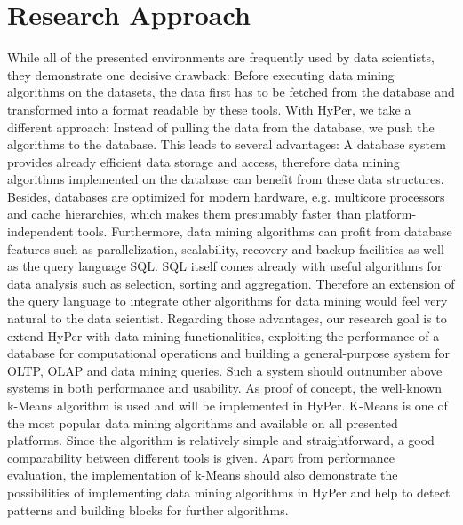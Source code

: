 \chapter{Research Approach}\label{chapter:research}

While all of the presented environments are frequently used by data scientists, they demonstrate one decisive drawback: Before executing data mining algorithms on the datasets, the data first has to be fetched from the database and transformed into a format readable by these tools. With HyPer, we take a different approach: Instead of pulling the data from the database, we push the algorithms to the database. This leads to several advantages: A database system provides already efficient data storage and access, therefore data mining algorithms implemented on the database can benefit from these data structures. Besides, databases are optimized for modern hardware, e.g. multicore processors and cache hierarchies, which makes them presumably faster than platform-independent tools. Furthermore, data mining algorithms can profit from database features such as parallelization, scalability, recovery and backup facilities as well as the query language SQL. SQL itself comes already with useful algorithms for data analysis such as selection, sorting and aggregation. Therefore an extension of the query language to integrate other algorithms for data mining would feel very natural to the data scientist. 
Regarding those advantages, our research goal is to extend HyPer with data mining functionalities, exploiting the performance of a database for computational operations and building a general-purpose system for OLTP, OLAP and data mining queries. Such a system should outnumber above systems in both performance and usability.
As proof of concept, the well-known k-Means algorithm is used and will be implemented in HyPer. K-Means is one of the most popular data mining algorithms and available on all presented platforms. Since the algorithm is relatively simple and straightforward, a good comparability between different tools is given. 
Apart from performance evaluation, the implementation of k-Means should also demonstrate the possibilities of implementing data mining algorithms in HyPer and help to detect patterns and building blocks for further algorithms.



